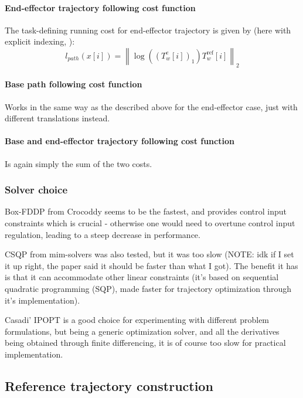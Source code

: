 \documentclass{article}
\begin{document}
\paragraph{End-effector trajectory following cost function}
The task-defining running cost for end-effector trajectory is 
given by (here with explicit indexing, ):
\begin{equation}
l_{ path } (x [i]) = 
\left\lVert \log 
\left( \left( T_{ w }^{ e } [i] \right) _{ 1 } \right) T_{ w }^{ \text{ref} } [i]
\right \rVert_{ 2 } 
\end{equation}

\paragraph{Base path following cost function}
Works in the same way as the described above for the end-effector case,
just with different translations instead.

\paragraph{Base and end-effector trajectory following cost function}
Is again simply the sum of the two costs.

\subsubsection{Solver choice}
Box-FDDP from Crocoddy seems to be the fastest, 
and provides control input constraints
which is crucial - otherwise one would need to overtune control input regulation,
leading to a steep decrease in performance.

CSQP from mim-solvers was also tested, but it was too slow (NOTE: idk
if I set it up right, the paper said it should be faster than what I got).
The benefit it has is that it can accommodate other linear constraints
(it's based on sequential quadratic programming (SQP), made faster
for trajectory optimization through it's implementation).

Casadi' IPOPT is a good choice for experimenting 
with different problem formulations,
but being a generic optimization solver, and all the derivatives 
being obtained through finite differencing, it is of course too slow 
for practical implementation.


\subsection{Reference trajectory construction}
\label{sub-reference-traj-construction}
\end{document}
